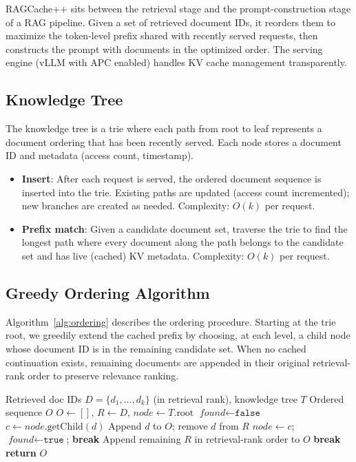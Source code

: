 \documentclass{article}
\begin{document}
RAGCache++ sits between the retrieval stage and the prompt-construction stage of a RAG pipeline. Given a set of retrieved document IDs, it reorders them to maximize the token-level prefix shared with recently served requests, then constructs the prompt with documents in the optimized order. The serving engine (vLLM with APC enabled) handles KV cache management transparently.

\subsection{Knowledge Tree}

The knowledge tree is a trie where each path from root to leaf represents a document ordering that has been recently served. Each node stores a document ID and metadata (access count, timestamp).

\begin{itemize}
\item \textbf{Insert}: After each request is served, the ordered document sequence is inserted into the trie. Existing paths are updated (access count incremented); new branches are created as needed. Complexity: $O(k)$ per request.
\item \textbf{Prefix match}: Given a candidate document set, traverse the trie to find the longest path where every document along the path belongs to the candidate set and has live (cached) KV metadata. Complexity: $O(k)$ per request.
\end{itemize}

\subsection{Greedy Ordering Algorithm}

Algorithm~\ref{alg:ordering} describes the ordering procedure. Starting at the trie root, we greedily extend the cached prefix by choosing, at each level, a child node whose document ID is in the remaining candidate set. When no cached continuation exists, remaining documents are appended in their original retrieval-rank order to preserve relevance ranking.

\begin{algorithm}[t]
\caption{Cache-aware document ordering}
\label{alg:ordering}
\begin{algorithmic}[1]
\REQUIRE Retrieved doc IDs $D = \{d_1, \ldots, d_k\}$ (in retrieval rank), knowledge tree $T$
\ENSURE Ordered sequence $O$
\STATE $O \leftarrow []$, $R \leftarrow D$, $\textit{node} \leftarrow T.\text{root}$
    \STATE $\textit{found} \leftarrow \texttt{false}$
        \STATE $c \leftarrow \textit{node}.\text{getChild}(d)$
            \STATE Append $d$ to $O$; remove $d$ from $R$
            \STATE $\textit{node} \leftarrow c$; $\textit{found} \leftarrow \texttt{true}$; \textbf{break}
        \ENDIF
    \ENDFOR
        \STATE Append remaining $R$ in retrieval-rank order to $O$
        \STATE \textbf{break}
    \ENDIF
\ENDWHILE
\STATE \textbf{return} $O$
\end{algorithmic}
\end{algorithm}
\end{document}
